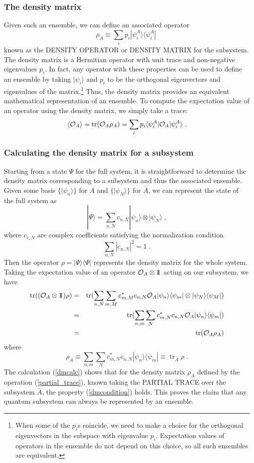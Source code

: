 \documentclass[12pt,epsf]{article}
\newcommand{\be}{\begin{equation}}
\newcommand{\ee}{\end{equation}}
\newcommand{\bea}{\begin{eqnarray}}
\newcommand{\eea}{\end{eqnarray}}
\newcommand{\tr}{\operatorname{tr}}
\def\identity{{\rlap{1} \hskip 1.6pt \hbox{1}}}
\begin{document}
\subsubsection*{The density matrix}

Given such an ensemble, we can define an associated operator
\be
\label{density_matrix}
\rho_A \equiv \sum_i p_i |\psi_i^A \rangle \langle \psi_i^A | \;
\ee
known as the DENSITY OPERATOR or DENSITY MATRIX for the subsystem. The density matrix is a Hermitian operator with unit trace and non-negative eigenvalues $p_i$. In fact, any operator with these properties can be used to define an ensemble by taking $|\psi_i \rangle$ and $p_i$ to be the orthogonal eigenvectors and eigenvalues of the matrix.\footnote{When some of the $p_i$s coincide, we need to make a choice for the orthogonal eigenvectors in the subspace with eigenvalue $p_i$. Expectation values of operators in the ensemble do not depend on this choice, so all such ensembles are equivalent.} Thus, the density matrix provides an equivalent mathematical representation of an ensemble. To compute the expectation value of an operator using the density matrix, we simply take a trace:
\be
\langle {\cal O}_A \rangle  = \tr({\cal O}_A \rho_A ) = \sum_i p_i  \langle \psi_i^A |{\cal O}_A |\psi_i^A \rangle \; .
\ee

\subsubsection*{Calculating the density matrix for a subsystem}

 Starting from a state $\Psi$ for the full system, it is straightforward to determine the density matrix corresponding to a subsystem and thus the associated ensemble. Given some basis $\{|\psi_n \rangle \}$ for $A$ and $\{|\psi_N \rangle \}$ for $\bar{A}$, we can represent the state of the full system as
\be
|\Psi \rangle = \sum_{n,N} c_{n,N} |\psi_n \rangle \otimes |\psi_N \rangle \; ,
\ee
where $c_{c,N}$ are complex coefficients satisfying the normalization condition
\be
\sum_{n,N} |c_{n,N}|^2 = 1 \; .
\ee
Then the operator $\rho = |\Psi \rangle \langle \Psi |$ represents the density matrix for the whole system. Taking the expectation value of an operator ${\cal O}_A \otimes \identity$ acting on our subsystem, we have
\bea
\tr(({\cal O}_A \otimes \identity) \rho ) &=&  \tr(\sum_{n,N} \sum_{m,M} c^*_{m,M} c_{n,N} {\cal O}_A |\psi_n \rangle \langle \psi_m | \otimes |\psi_N \rangle  \langle \psi_M | )  \cr
&=& \tr( \sum_{n,m} \sum_N c^*_{m,N} c_{n,N} {\cal O}_A |\psi_n \rangle \langle \psi_m |)  \cr
&=& \tr({\cal O}_A \rho_A)
\label{dmcalc}
\eea
where
\be
\label{partial_trace}
\rho_A  \equiv \sum_{n,m} \sum_N c^*_{m,N} c_{n,N} |\psi_n \rangle \langle \psi_m | \equiv \tr_{\bar{A}} \rho \; .
\ee
The calculation (\ref{dmcalc}) shows that for the density matrix $\rho_A$ defined by the operation (\ref{partial_trace}), known taking the PARTIAL TRACE over the subsystem $\bar{A}$, the property (\ref{dmcondition}) holds. This proves the claim that any quantum subsystem can always be represented by an ensemble.
\end{document}

